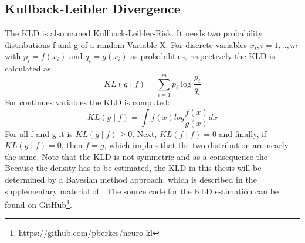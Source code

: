 \subsection{Kullback-Leibler Divergence}\label{TlSubSecKLD}
The \acl{KLD} is also named Kullback-Leibler-Risk.
It needs two probability distributions f and g of a random Variable X.
For discrete variables $x_i, i=1,..,m$ with $p_i=f(x_i)$ and $q_i=g(x_i)$ as probabilities, respectively the \acs{KLD} is calculated as:
\begin{equation}
KL(g\mid f) = \sum_{i=1}^{m}p_i\log\frac{p_i}{q_i}
\end{equation} 
For continues variables the \ac{KLD} is computed:
\begin{equation}
KL(g\mid f) = \int f(x)log\frac{f(x)}{g(x)} dx
\end{equation}
For all f and g it is $KL(g\mid f) \ge 0$. Next, $KL(f\mid f) = 0$ and finally, if $KL(g\mid f) = 0$, then $f = g$, which implies that the two distribution are nearly the same.
Note that the \acs{KLD} is not symmetric and as a consequence the  \cite[p.5-7]{Commenges.}\\
Because the density has to be estimated, the \acs{KLD} in this thesis will be determined by a Bayesian method approach, which is described in the supplementary material of \cite{Berkes.2011}.
The source code for the \acs{KLD} estimation can be found on GitHub\footnote{\url{https://github.com/pberkes/neuro-kl}}.

